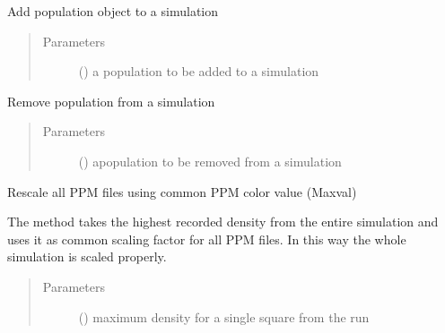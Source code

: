 \documentclass[letterpaper,10pt,english]{sphinxmanual}
\begin{document}
\begin{fulllineitems}
\begin{fulllineitems}
\label{\detokenize{pumha:pumha.sim.Simulation.add_population}}
Add population object to a simulation
\begin{quote}\begin{description}
\item[{Parameters}] \leavevmode
{} ({\hyperref[\detokenize{pumha:pumha.pop.Population}]{}}) \textendash{} a population to be added to a simulation

\end{description}\end{quote}

\end{fulllineitems}


\begin{fulllineitems}
\label{\detokenize{pumha:pumha.sim.Simulation.remove_population}}
Remove population from a simulation
\begin{quote}\begin{description}
\item[{Parameters}] \leavevmode
{} ({\hyperref[\detokenize{pumha:pumha.pop.Population}]{}}) \textendash{} apopulation to be removed from a simulation

\end{description}\end{quote}

\end{fulllineitems}


\begin{fulllineitems}
\label{\detokenize{pumha:pumha.sim.Simulation.rescale_ppm_files}}
Rescale all PPM files using common PPM color value (Maxval)

The method takes the highest recorded density from the entire
simulation and uses it as common scaling factor for all PPM files.
In this way the whole simulation is scaled properly.
\begin{quote}\begin{description}
\item[{Parameters}] \leavevmode
{} (\sphinxstyleliteralemphasis{, }) \textendash{} maximum density for a single square from the run


\end{description}
\end{quote}
\end{fulllineitems}
\end{fulllineitems}
\end{document}
